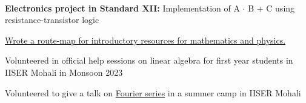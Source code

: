 \documentclass{LoLaTeXcv}
\begin{document}

\

\begin{lltxItemize}
	\item \textbf{Electronics project in Standard XII:} Implementation of A $\cdot$ B + C using resistance-transistor logic
	\item \href{https://rupadarshiray.github.io/academia/inculcation}{Wrote a route-map for introductory resources for mathematics and physics.}
	\item Volunteered in official help sessions on linear algebra for first year students in IISER Mohali in Monsoon 2023
	\item Volunteered to give a talk on \href{https://ggl.link/fourier}{Fourier series} in a summer camp in IISER Mohali
\end{lltxItemize}





\end{document}
